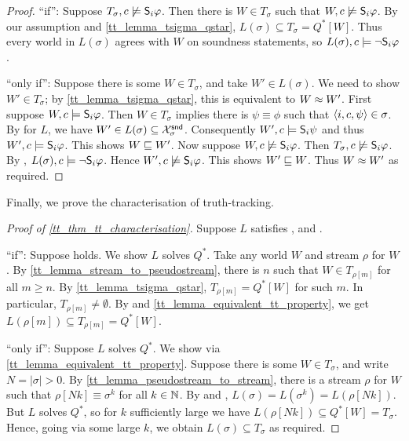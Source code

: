 \begin{proof}

    ``if'': Suppose $T_\sigma, c \not\models \S_i\phi$. Then there is $W \in
    T_\sigma$ such that $W, c \not\models \S_i\phi$. By our assumption and
    \cref{tt_lemma_tsigma_qstar}, $L(\sigma) \subseteq T_\sigma = Q^*[W]$. Thus
    every world in $L(\sigma)$ agrees with $W$ on soundness statements, so
    $L(\sigma), c \models \neg\S_i\phi$.

    ``only if'': Suppose there is some $W \in T_\sigma$, and take $W' \in
    L(\sigma)$. We need to show $W' \in T_\sigma$; by
    \cref{tt_lemma_tsigma_qstar}, this is equivalent to $W \speceq W'$.
    First suppose $W, c \models \S_i\phi$. Then $W \in T_\sigma$ implies there
    is $\psi \equiv \phi$ such that $\tuple{i, c, \psi} \in \sigma$. By
    \soundness{} for $L$, we have $W' \in L(\sigma) \subseteq \Xsnd_\sigma$.
    Consequently $W', c \models \S_i\psi$ and thus $W', c \models \S_i\phi$.
    This shows $W \specleq W'$.
    Now suppose $W, c \not\models \S_i\phi$. Then $T_\sigma, c \not\models
    \S_i\phi$. By \credulity{}, $L(\sigma), c
    \models \neg\S_i\phi$. Hence $W', c \not\models \S_i\phi$. This shows $W'
    \specleq W$. Thus $W \speceq W'$ as required.
\end{proof}

Finally, we prove the characterisation of truth-tracking.

\begin{proof}[Proof of \cref{tt_thm_tt_characterisation}]
    Suppose $L$ satisfies \equivalence{}, \repetition{} and \soundness{}.

    ``if'': Suppose \credulity{} holds. We show $L$
    solves $Q^*$. Take any world $W$ and stream $\rho$ for $W$.  By
    \cref{tt_lemma_stream_to_pseudostream}, there is $n$ such that $W \in
    T_{\rho[m]}$ for all $m \ge n$. By \cref{tt_lemma_tsigma_qstar}, $T_{\rho[m]}
    = Q^*[W]$ for such $m$. In particular, $T_{\rho[m]} \ne \emptyset$.  By
    \credulity{} and
    \cref{tt_lemma_equivalent_tt_property}, we get $L(\rho[m]) \subseteq
    T_{\rho[m]} = Q^*[W]$.

    ``only if'': Suppose $L$ solves $Q^*$. We show
    \credulity{} via
    \cref{tt_lemma_equivalent_tt_property}. Suppose there is some $W \in
    T_\sigma$, and write $N = |\sigma| > 0$. By
    \cref{tt_lemma_pseudostream_to_stream}, there is a stream $\rho$ for $W$ such
    that $\rho[Nk] \equiv \sigma^k$ for all $k \in \N$. By \repetition{} and
    \equivalence{}, $L(\sigma) = L(\sigma^k) = L(\rho[Nk])$. But $L$ solves
    $Q^*$, so for $k$ sufficiently large we have $L(\rho[Nk]) \subseteq Q^*[W]
    = T_\sigma$. Hence, going via some large $k$, we obtain $L(\sigma)
    \subseteq T_\sigma$ as required.
\end{proof}

